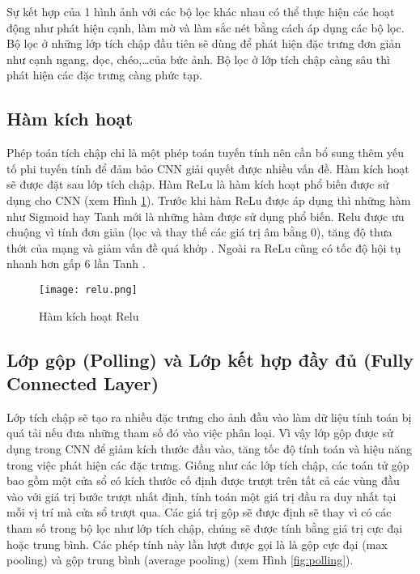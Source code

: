 \documentclass[../the.tex]{subfiles}
\begin{document}
{\fontsize{13}{12} \selectfont

Sự kết hợp của 1 hình ảnh với các bộ lọc khác nhau có thể thực hiện các hoạt động như phát hiện cạnh, làm mờ và làm sắc nét bằng cách áp dụng các bộ lọc.
Bộ lọc ở những lớp tích chập đầu tiên sẽ dùng để phát hiện đặc trưng đơn giản như cạnh ngang, dọc, chéo,\dots của bức ảnh. Bộ lọc ở lớp tích chập càng sâu thì phát hiện các đặc trưng càng phức tạp.

}


\subsection{Hàm kích hoạt}

{\fontsize{13}{12} \selectfont

	Phép toán tích chập chỉ là một phép toán tuyến tính nên cần bổ sung thêm yếu tố phi tuyến tính để đảm bảo CNN giải quyết được nhiều vấn đề.
	Hàm kích hoạt sẽ được đặt sau lớp tích chập.
	Hàm ReLu \cite{nair2010rectified} là hàm kích hoạt phổ biến được sử dụng cho CNN  (xem Hình \ref{fig:relu}). Trước khi hàm ReLu được áp dụng thì những hàm như Sigmoid hay Tanh mới là những hàm được sử dụng phổ biến.
	Relu được ưu chuộng vì tính đơn giản (lọc và thay thế các giá trị âm bằng 0), tăng độ thưa thớt của mạng và giảm vấn đề quá khớp \cite{caruana2000overfitting}.
	Ngoài ra ReLu cũng có tốc độ hội tụ nhanh hơn gấp 6 lần Tanh \cite{krizhevsky2012imagenet}.

}

\begin{figure}[H]
	\centering
	\texttt{[image: relu.png]}
	\caption{Hàm kích hoạt Relu}
	\label{fig:relu}
\end{figure}

\subsection{Lớp gộp (Polling) và Lớp kết hợp đầy đủ (Fully Connected Layer)}

{\fontsize{13}{12} \selectfont

	Lớp tích chập sẽ tạo ra nhiều đặc trưng cho ảnh đầu vào làm dữ liệu tính toán bị quá tải nếu đưa những tham số đó vào việc phân loại.
	Vì vậy lớp gộp được sử dụng trong CNN để giảm kích thước đầu vào, tăng tốc độ tính toán và hiệu năng trong việc phát hiện các đặc trưng.
	Giống như các lớp tích chập, các toán tử gộp bao gồm một cửa sổ có kích thước cố định được trượt trên tất cả các vùng đầu vào với giá trị bước trượt nhất định, tính toán một giá trị đầu ra duy nhất tại mỗi vị trí mà cửa sổ trượt qua.
	Các giá trị gộp sẽ được định sẽ thay vì có các tham số trong bộ lọc như lớp tích chập, chúng sẽ được tính bằng giá trị cực đại hoặc trung bình.
	Các phép tính này lần lượt được gọi là là gộp cực đại (max pooling) và gộp trung bình (average pooling) (xem Hình
	\ref{fig:polling}).

}
\end{document}
